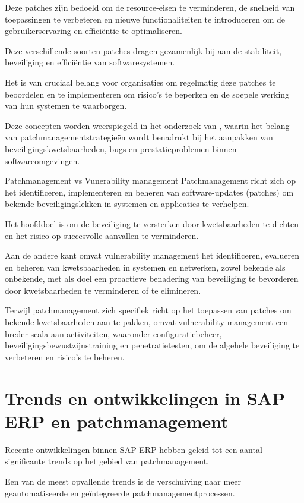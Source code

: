  Deze patches zijn bedoeld om de resource-eisen te verminderen, de snelheid van toepassingen te verbeteren en nieuwe functionaliteiten te introduceren om de gebruikerservaring en efficiëntie te optimaliseren.


Deze verschillende soorten patches dragen gezamenlijk bij aan de stabiliteit, beveiliging en efficiëntie van softwaresystemen.

 Het is van cruciaal belang voor organisaties om regelmatig deze patches te beoordelen en te implementeren om risico's te beperken en de soepele werking van hun systemen te waarborgen.


Deze concepten worden weerspiegeld in het onderzoek van \textcite{Wrobel2023}, waarin het belang van patchmanagementstrategieën wordt benadrukt bij het aanpakken van beveiligingskwetsbaarheden, bugs en prestatieproblemen binnen softwareomgevingen.



Patchmanagement vs Vunerability management
Patchmanagement richt zich op het identificeren, implementeren en beheren van software-updates (patches) om bekende beveiligingslekken in systemen en applicaties te verhelpen.

 Het hoofddoel is om de beveiliging te versterken door kwetsbaarheden te dichten en het risico op succesvolle aanvallen te verminderen.

 Aan de andere kant omvat vulnerability management het identificeren, evalueren en beheren van kwetsbaarheden in systemen en netwerken, zowel bekende als onbekende, met als doel een proactieve benadering van beveiliging te bevorderen door kwetsbaarheden te verminderen of te elimineren.

 Terwijl patchmanagement zich specifiek richt op het toepassen van patches om bekende kwetsbaarheden aan te pakken, omvat vulnerability management een breder scala aan activiteiten, waaronder configuratiebeheer, beveiligingsbewustzijnstraining en penetratietesten, om de algehele beveiliging te verbeteren en risico's te beheren.

 \autocite{Danby2023}

\section{Trends en ontwikkelingen in SAP ERP en patchmanagement}
Recente ontwikkelingen binnen SAP ERP hebben geleid tot een aantal significante trends op het gebied van patchmanagement.

 Een van de meest opvallende trends is de verschuiving naar meer geautomatiseerde en geïntegreerde patchmanagementprocessen.

